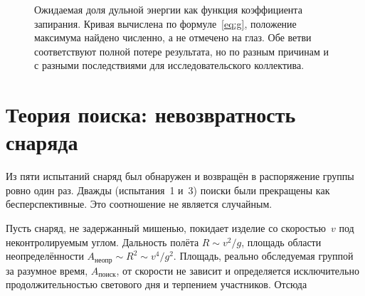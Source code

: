 \documentclass[11pt,a4paper]{article}
\begin{document}
\begin{figure}[h!]
\centering
{}
\caption{Ожидаемая доля дульной энергии как функция коэффициента запирания. Кривая вычислена по формуле~\eqref{eq:g}, положение максимума найдено численно, а не отмечено на глаз. Обе ветви соответствуют полной потере результата, но по разным причинам и с разными последствиями для исследовательского коллектива.}
\label{fig:plug}
\end{figure}

\section{Теория поиска: невозвратность снаряда}

Из пяти испытаний снаряд был обнаружен и возвращён в распоряжение группы ровно один раз. Дважды (испытания~1 и~3) поиски были прекращены как бесперспективные. Это соотношение не является случайным.

Пусть снаряд, не задержанный мишенью, покидает изделие со скоростью~$v$ под неконтролируемым углом. Дальность полёта $R\sim v^2/g$, площадь области неопределённости $A_{\text{неопр}}\sim R^2\sim v^4/g^2$. Площадь, реально обследуемая группой за разумное время, $A_{\text{поиск}}$, от скорости не зависит и определяется исключительно продолжительностью светового дня и терпением участников. Отсюда
\end{document}

